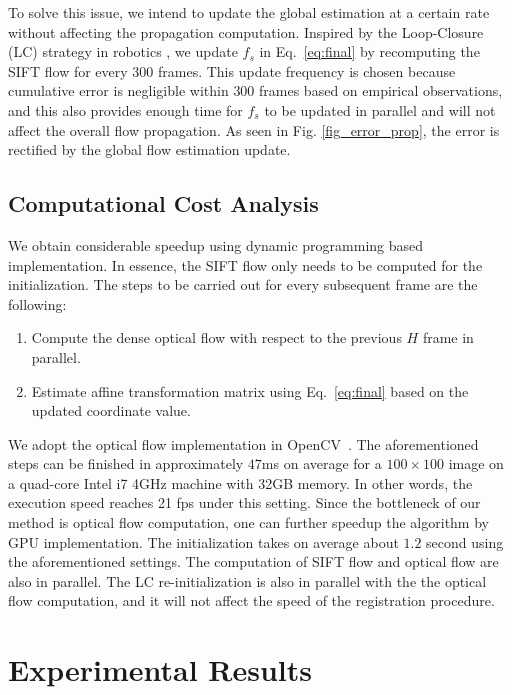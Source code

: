 \documentclass[10pt,journal]{IEEEtran}
\begin{document}
To solve this issue, we intend to update the global estimation at a certain rate without affecting the propagation computation. Inspired by the Loop-Closure (LC) strategy in robotics \cite{close_loop_icra_05}, we update $f_s$ in Eq.~\eqref{eq:final} by recomputing the SIFT flow for every $300$ frames. This update frequency is chosen because cumulative error is negligible within $300$ frames based on empirical observations, and this also provides enough time for $f_s$ to be updated in parallel and will not affect the overall flow propagation. As seen in Fig. \ref{fig_error_prop}, the error is rectified by the global flow estimation update. 


\subsection{\label{sec:time}Computational Cost Analysis}
We obtain considerable speedup using dynamic programming based implementation. In essence, the SIFT flow only needs to be computed for the initialization. The steps to be carried out for every subsequent frame are the following:
\begin{enumerate}
\item Compute the dense optical flow with respect to the previous $H$ frame in parallel.
\item Estimate affine transformation matrix using Eq.~\eqref{eq:final} based on the updated coordinate value.
\end{enumerate}

We adopt the optical flow implementation in OpenCV~\cite{opencv}. The aforementioned steps can be finished in approximately $47$ms on average for a $100\times100$ image on a quad-core Intel i7 4GHz machine with 32GB memory. In other words, the execution speed reaches 21 fps under this setting. Since the bottleneck of our method is optical flow computation, one can further speedup the algorithm by GPU implementation. The initialization takes on average about $1.2$ second using the aforementioned settings. The computation of SIFT flow and optical flow are also in parallel. The LC re-initialization is also in parallel with the the optical flow computation, and it will not affect the speed of the registration procedure. 


\section{\label{sec:experiment}Experimental Results}
\end{document}
